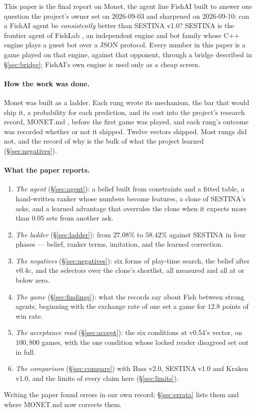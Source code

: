 \documentclass[11pt]{article}
\newcommand{\monet}{MONET.md}
\newcommand{\sect}[1]{\S#1}
\begin{document}
This paper is the final report on Monet, the agent line FishAI built to answer one question the
project's owner set on 2026-09-03 and sharpened on 2026-09-10: can a FishAI agent be \emph{consistently}
better than SESTINA v1.0? SESTINA is the frontier agent of FishLab \cite{fishlab}, an independent
engine and bot family whose C++ engine plays a guest bot over a JSON protocol. Every number in this
paper is a game played on that engine, against that opponent, through a bridge described in
\sect\ref{sec:bridge}; FishAI's own engine is used only as a cheap screen.

\paragraph{How the work was done.} Monet was built as a ladder. Each rung wrote its mechanism, the bar
that would ship it, a probability for each prediction, and its cost into the project's research record,
\monet{} \cite{monet}, before the first game was played, and each rung's outcome was recorded whether
or not it shipped. Twelve vectors shipped. Most rungs did not, and the record of why is the bulk of what
the project learned (\sect\ref{sec:negatives}).

\paragraph{What the paper reports.}
\begin{enumerate}
  \item \emph{The agent} (\sect\ref{sec:agent}): a belief built from constraints and a fitted table, a
        hand-written ranker whose numbers become features, a clone of SESTINA's asks, and a learned
        advantage that overrules the clone when it expects more than $0.05$ sets from another ask.
  \item \emph{The ladder} (\sect\ref{sec:ladder}): from $27.08\%$ to $58.42\%$ against SESTINA in four
        phases --- belief, ranker terms, imitation, and the learned correction.
  \item \emph{The negatives} (\sect\ref{sec:negatives}): six forms of play-time search, the belief after
        v0.4c, and the selectors over the clone's shortlist, all measured and all at or below zero.
  \item \emph{The game} (\sect\ref{sec:findings}): what the records say about Fish between strong agents,
        beginning with the exchange rate of one set a game for $12.8$ points of win rate.
  \item \emph{The acceptance read} (\sect\ref{sec:accept}): the six conditions at v0.54's vector, on
        $100{,}800$ games, with the one condition whose locked reader disagreed set out in full.
  \item \emph{The comparison} (\sect\ref{sec:compare}) with Bass v2.0, SESTINA v1.0 and Kraken v1.0, and
        the limits of every claim here (\sect\ref{sec:limits}).
\end{enumerate}
Writing the paper found errors in our own record; \sect\ref{sec:errata} lists them and where \monet{}
now corrects them.
\end{document}
